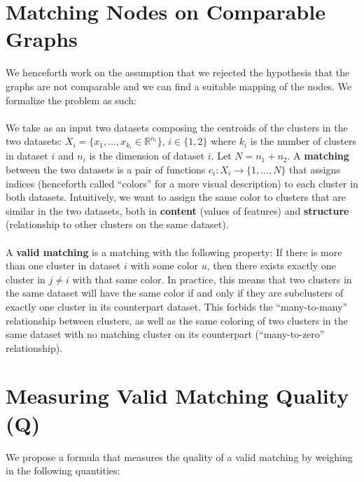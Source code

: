 \documentclass[11pt]{article}
\begin{document}
\section{Matching Nodes on Comparable Graphs}
We henceforth work on the assumption that we rejected the hypothesis that the graphs are not comparable and we can find a suitable mapping of the nodes. We formalize the problem as such:\\
\\
We take as an input two datasets composing the centroids of the clusters in the two datasets: $X_i = \{x_1, \dots, x_{k_i} \in \mathbb{R}^{n_i}\}$, $i \in \{1,2\}$ where $k_i$ is the number of clusters in dataset $i$ and $n_i$ is the dimension of dataset $i$. Let $N = n_1 + n_2$. A \textbf{matching} between the two datasets is a pair of functions $c_i : X_i \to \{1, \dots, N\}$ that assigns indices (henceforth called ``colors'' for a more visual description) to each cluster in both datasets. Intuitively, we want to assign the same color to clusters that are similar in the two datasets, both in \textbf{content} (values of features) and \textbf{structure} (relationship to other clusters on the same dataset).\\
\\
A \textbf{valid matching} is a matching with the following property: If there is more than one cluster in dataset $i$ with some color $u$, then there exists exactly one cluster in $j \neq i$ with that same color. In practice, this means that two clusters in the same dataset will have the same color if and only if they are subclusters of exactly one cluster in its counterpart dataset. This forbids the ``many-to-many'' relationship between clusters, as well as the same coloring of two clusters in the same dataset with no matching cluster on its counterpart (``many-to-zero'' relationship).

\section{Measuring Valid Matching Quality (Q)}
We propose a formula that measures the quality of a valid matching by weighing in the following quantities:
\end{document}

